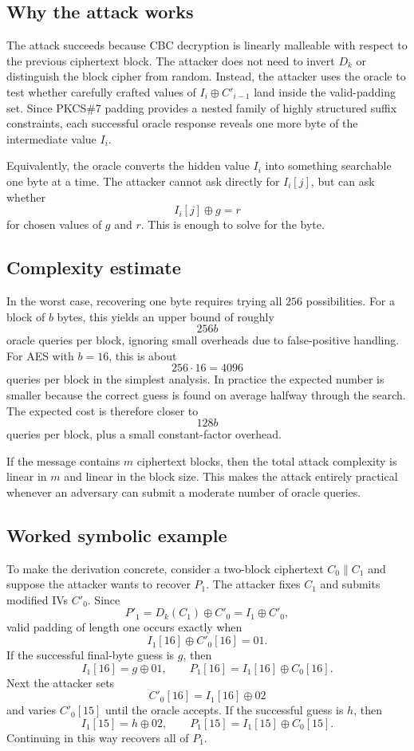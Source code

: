 \subsection{Why the attack works}

The attack succeeds because CBC decryption is linearly malleable with respect to the previous ciphertext block. The attacker does not need to invert $D_k$ or distinguish the block cipher from random. Instead, the attacker uses the oracle to test whether carefully crafted values of $I_i \oplus C'_{i-1}$ land inside the valid-padding set. Since PKCS\#7 padding provides a nested family of highly structured suffix constraints, each successful oracle response reveals one more byte of the intermediate value $I_i$.

Equivalently, the oracle converts the hidden value $I_i$ into something searchable one byte at a time. The attacker cannot ask directly for $I_i[j]$, but can ask whether
\[
I_i[j] \oplus g = r
\]
for chosen values of $g$ and $r$. This is enough to solve for the byte.

\subsection{Complexity estimate}

In the worst case, recovering one byte requires trying all $256$ possibilities. For a block of $b$ bytes, this yields an upper bound of roughly
\[
256b
\]
oracle queries per block, ignoring small overheads due to false-positive handling. For AES with $b=16$, this is about
\[
256 \cdot 16 = 4096
\]
queries per block in the simplest analysis. In practice the expected number is smaller because the correct guess is found on average halfway through the search. The expected cost is therefore closer to
\[
128b
\]
queries per block, plus a small constant-factor overhead.

If the message contains $m$ ciphertext blocks, then the total attack complexity is linear in $m$ and linear in the block size. This makes the attack entirely practical whenever an adversary can submit a moderate number of oracle queries.

\subsection{Worked symbolic example}

To make the derivation concrete, consider a two-block ciphertext $C_0\|C_1$ and suppose the attacker wants to recover $P_1$. The attacker fixes $C_1$ and submits modified IVs $C'_0$. Since
\[
P'_1 = D_k(C_1) \oplus C'_0 = I_1 \oplus C'_0,
\]
valid padding of length one occurs exactly when
\[
I_1[16] \oplus C'_0[16] = 01.
\]
If the successful final-byte guess is $g$, then
\[
I_1[16] = g \oplus 01,
\qquad
P_1[16] = I_1[16] \oplus C_0[16].
\]
Next the attacker sets
\[
C'_0[16] = I_1[16] \oplus 02
\]
and varies $C'_0[15]$ until the oracle accepts. If the successful guess is $h$, then
\[
I_1[15] = h \oplus 02,
\qquad
P_1[15] = I_1[15] \oplus C_0[15].
\]
Continuing in this way recovers all of $P_1$.

